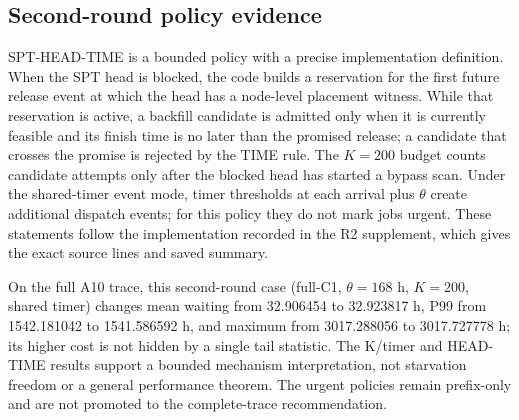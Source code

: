 \subsection{Second-round policy evidence}
SPT-HEAD-TIME is a bounded policy with a precise implementation definition. When the SPT head is blocked, the code builds a reservation for the first future release event at which the head has a node-level placement witness. While that reservation is active, a backfill candidate is admitted only when it is currently feasible and its finish time is no later than the promised release; a candidate that crosses the promise is rejected by the TIME rule. The $K=200$ budget counts candidate attempts only after the blocked head has started a bypass scan. Under the shared-timer event mode, timer thresholds at each arrival plus $\theta$ create additional dispatch events; for this policy they do not mark jobs urgent. These statements follow the implementation recorded in the R2 supplement, which gives the exact source lines and saved summary.

On the full A10 trace, this second-round case (full-C1, $\theta=168$ h, $K=200$, shared timer) changes mean waiting from 32.906454 to 32.923817 h, P99 from 1542.181042 to 1541.586592 h, and maximum from 3017.288056 to 3017.727778 h; its higher cost is not hidden by a single tail statistic. The K/timer and HEAD-TIME results support a bounded mechanism interpretation, not starvation freedom or a general performance theorem. The urgent policies remain prefix-only and are not promoted to the complete-trace recommendation.
